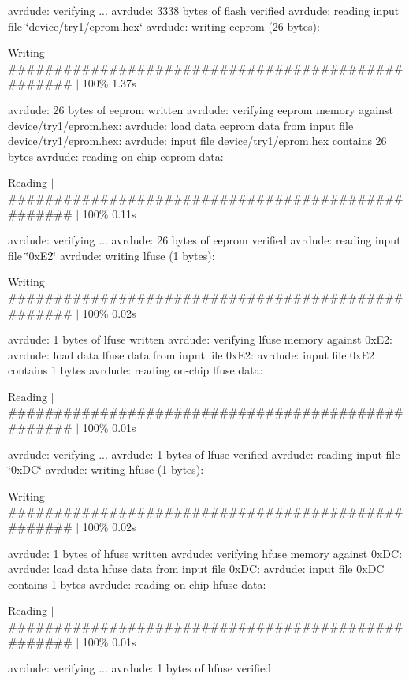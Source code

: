 avrdude\-: verifying ... avrdude\-: 3338 bytes of flash verified avrdude\-: reading input file \char`\"{}device/try1/eprom.\-hex\char`\"{} avrdude\-: writing eeprom (26 bytes)\-:

Writing $\vert$ \#\#\#\#\#\#\#\#\#\#\#\#\#\#\#\#\#\#\#\#\#\#\#\#\#\#\#\#\#\#\#\#\#\#\#\#\#\#\#\#\#\#\#\#\#\#\#\#\#\# $\vert$ 100\% 1.\-37s

avrdude\-: 26 bytes of eeprom written avrdude\-: verifying eeprom memory against device/try1/eprom.\-hex\-: avrdude\-: load data eeprom data from input file device/try1/eprom.\-hex\-: avrdude\-: input file device/try1/eprom.\-hex contains 26 bytes avrdude\-: reading on-\/chip eeprom data\-:

Reading $\vert$ \#\#\#\#\#\#\#\#\#\#\#\#\#\#\#\#\#\#\#\#\#\#\#\#\#\#\#\#\#\#\#\#\#\#\#\#\#\#\#\#\#\#\#\#\#\#\#\#\#\# $\vert$ 100\% 0.\-11s

avrdude\-: verifying ... avrdude\-: 26 bytes of eeprom verified avrdude\-: reading input file \char`\"{}0x\-E2\char`\"{} avrdude\-: writing lfuse (1 bytes)\-:

Writing $\vert$ \#\#\#\#\#\#\#\#\#\#\#\#\#\#\#\#\#\#\#\#\#\#\#\#\#\#\#\#\#\#\#\#\#\#\#\#\#\#\#\#\#\#\#\#\#\#\#\#\#\# $\vert$ 100\% 0.\-02s

avrdude\-: 1 bytes of lfuse written avrdude\-: verifying lfuse memory against 0x\-E2\-: avrdude\-: load data lfuse data from input file 0x\-E2\-: avrdude\-: input file 0x\-E2 contains 1 bytes avrdude\-: reading on-\/chip lfuse data\-:

Reading $\vert$ \#\#\#\#\#\#\#\#\#\#\#\#\#\#\#\#\#\#\#\#\#\#\#\#\#\#\#\#\#\#\#\#\#\#\#\#\#\#\#\#\#\#\#\#\#\#\#\#\#\# $\vert$ 100\% 0.\-01s

avrdude\-: verifying ... avrdude\-: 1 bytes of lfuse verified avrdude\-: reading input file \char`\"{}0x\-D\-C\char`\"{} avrdude\-: writing hfuse (1 bytes)\-:

Writing $\vert$ \#\#\#\#\#\#\#\#\#\#\#\#\#\#\#\#\#\#\#\#\#\#\#\#\#\#\#\#\#\#\#\#\#\#\#\#\#\#\#\#\#\#\#\#\#\#\#\#\#\# $\vert$ 100\% 0.\-02s

avrdude\-: 1 bytes of hfuse written avrdude\-: verifying hfuse memory against 0x\-D\-C\-: avrdude\-: load data hfuse data from input file 0x\-D\-C\-: avrdude\-: input file 0x\-D\-C contains 1 bytes avrdude\-: reading on-\/chip hfuse data\-:

Reading $\vert$ \#\#\#\#\#\#\#\#\#\#\#\#\#\#\#\#\#\#\#\#\#\#\#\#\#\#\#\#\#\#\#\#\#\#\#\#\#\#\#\#\#\#\#\#\#\#\#\#\#\# $\vert$ 100\% 0.\-01s

avrdude\-: verifying ... avrdude\-: 1 bytes of hfuse verified

